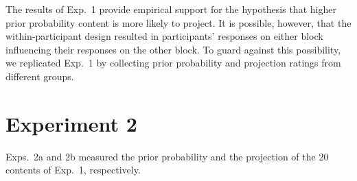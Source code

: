 \documentclass[OpenMind]{stjour}
\newcommand{\jt}[1]{\textbf{\color{blue}JT: #1}}
\begin{document}
%
%
%


The results of Exp.~1 provide empirical support for the hypothesis that higher prior probability content is more likely to project. It is possible, however, that the within-participant design resulted in participants' responses on either block influencing their responses on the other block. To guard against this possibility, we replicated Exp.~1 by collecting prior probability and projection ratings from different groups.  

\section{Experiment 2}\label{s3}

Exps.~2a and 2b measured the prior probability and the projection of the 20 contents of Exp.~1, respectively.
\end{document}
